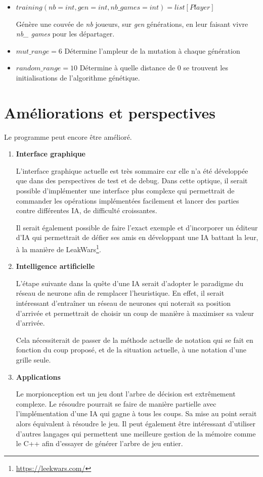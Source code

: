 \documentclass[10pt, french]{article}
\begin{document}
\begin{itemize}
\item $training(nb=int, gen= int, nb\_games=int)=list[Player]$ \par Génère une couvée de \emph{nb} joueurs, sur \emph{gen} générations, en leur faisant vivre \emph{nb\_ games} pour les départager.
\item $mut\_range = 6$ \qquad Détermine l'ampleur de la mutation à chaque génération
\item $random\_range = 10$ \quad Détermine à quelle distance de $0$ se trouvent les initialisations de l'algorithme génétique.
\end{itemize}

\paragraph{}
\section{Améliorations et perspectives}
Le programme peut encore être amélioré.
    \begin{enumerate}

\item \textbf{Interface graphique} 

L'interface graphique actuelle est très sommaire car elle n'a été développée que dans des perspectives de test et de debug. Dans cette optique, il serait possible d'implémenter une interface plus complexe qui permettrait de commander les opérations implémentées facilement et lancer des parties contre différentes IA, de difficulté croissantes.
\par Il serait également possible de faire l'exact exemple et d'incorporer un éditeur d'IA qui permettrait de défier ses amis en développant une IA battant la leur, à la manière de LeakWars\footnote{\url{https://leekwars.com/}}.

\item \textbf{Intelligence artificielle} 

L'étape suivante dans la quête d'une IA serait d'adopter le paradigme du réseau de neurone afin de remplacer l'heuristique. En effet, il serait intéressant d'entraîner un réseau de neurones qui noterait sa position d'arrivée et permettrait de choisir un coup de manière à maximiser sa valeur d'arrivée.
\par Cela nécessiterait de passer de la méthode actuelle de notation qui se fait en fonction du coup proposé, et de la situation actuelle, à une notation d'une grille seule.

\item \textbf{Applications} 
\par Le morpionception est un jeu dont l'arbre de décision est extrêmement complexe. Le résoudre pourrait se faire de manière partielle avec l’implémentation d'une IA qui gagne à tous les coups. Sa mise au point serait alors équivalent à résoudre le jeu. Il peut également être intéressant d'utiliser d'autres langages qui permettent une meilleure gestion de la mémoire comme le C++ afin d'essayer de générer l'arbre de jeu entier.

\end{enumerate}
\end{document}
